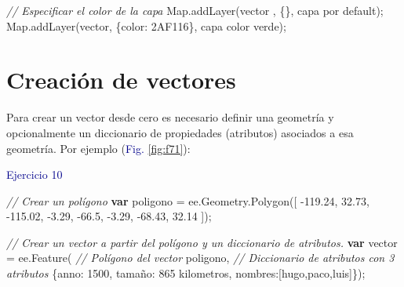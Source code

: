 \documentclass[
  12pt,
  letterpaper,
  twoside]{book}
\newenvironment{Shaded}{\begin{snugshade}}{\end{snugshade}}
\newcommand{\AttributeTok}[1]{\textcolor[rgb]{0.48,0.12,0.64}{#1}}
\newcommand{\BuiltInTok}[1]{#1}
\newcommand{\CommentTok}[1]{\textcolor[rgb]{0.24,0.58,0.00}{\textit{#1}}}
\newcommand{\DataTypeTok}[1]{\textcolor[rgb]{0.00,0.00,0.00}{#1}}
\newcommand{\DecValTok}[1]{\textcolor[rgb]{0.28,0.53,0.93}{#1}}
\newcommand{\FloatTok}[1]{\textcolor[rgb]{0.28,0.53,0.93}{#1}}
\newcommand{\FunctionTok}[1]{\textcolor[rgb]{0.48,0.12,0.64}{#1}}
\newcommand{\KeywordTok}[1]{\textcolor[rgb]{0.00,0.00,0.00}{\textbf{#1}}}
\newcommand{\NormalTok}[1]{#1}
\newcommand{\OperatorTok}[1]{\textcolor[rgb]{0.00,0.00,0.00}{#1}}
\newcommand{\StringTok}[1]{\textcolor[rgb]{0.87,0.29,0.22}{#1}}
\begin{document}
\begin{Shaded}
\begin{Highlighting}[]
\CommentTok{// Especificar el color de la capa }
\BuiltInTok{Map}\OperatorTok{.}\FunctionTok{addLayer}\NormalTok{(vector }\OperatorTok{,}\NormalTok{ \{\}}\OperatorTok{,} \StringTok{\textquotesingle{}capa por default\textquotesingle{}}\NormalTok{)}\OperatorTok{;}
\BuiltInTok{Map}\OperatorTok{.}\FunctionTok{addLayer}\NormalTok{(vector}\OperatorTok{,}\NormalTok{ \{}\DataTypeTok{color}\OperatorTok{:} \StringTok{\textquotesingle{}2AF116\textquotesingle{}}\NormalTok{\}}\OperatorTok{,} \StringTok{\textquotesingle{}capa color verde\textquotesingle{}}\NormalTok{)}\OperatorTok{;}
\end{Highlighting}
\end{Shaded}

\hypertarget{creaciuxf3n-de-vectores}{%
\section{Creación de vectores}\label{creaciuxf3n-de-vectores}}

Para crear un vector desde cero es necesario definir una geometría y opcionalmente un diccionario de propiedades (atributos) asociados a esa geometría. Por ejemplo (\textcolor{darkblue}{Fig.} \ref{fig:f71}):

\textcolor{darkblue}{Ejercicio 10}

\begin{Shaded}
\begin{Highlighting}[]
\CommentTok{// Crear un polígono}
\KeywordTok{var}\NormalTok{ poligono }\OperatorTok{=}\NormalTok{ ee}\OperatorTok{.}\AttributeTok{Geometry}\OperatorTok{.}\FunctionTok{Polygon}\NormalTok{([}
  \OperatorTok{{-}}\FloatTok{119.24}\OperatorTok{,} \FloatTok{32.73}\OperatorTok{,}
  \OperatorTok{{-}}\FloatTok{115.02}\OperatorTok{,} \OperatorTok{{-}}\FloatTok{3.29}\OperatorTok{,}
  \OperatorTok{{-}}\FloatTok{66.5}\OperatorTok{,} \OperatorTok{{-}}\FloatTok{3.29}\OperatorTok{,}
  \OperatorTok{{-}}\FloatTok{68.43}\OperatorTok{,} \FloatTok{32.14}
\NormalTok{])}\OperatorTok{;}

\CommentTok{// Crear un vector a partir del polígono y un diccionario de atributos.}
\KeywordTok{var}\NormalTok{ vector }\OperatorTok{=}\NormalTok{ ee}\OperatorTok{.}\FunctionTok{Feature}\NormalTok{(}
  \CommentTok{// Polígono del vector}
\NormalTok{  poligono}\OperatorTok{,}                      
  \CommentTok{// Diccionario de atributos con 3 atributos}
\NormalTok{  \{}\DataTypeTok{anno}\OperatorTok{:} \DecValTok{1500}\OperatorTok{,}                    
  \DataTypeTok{tamaño}\OperatorTok{:} \StringTok{\textquotesingle{}865 kilometros\textquotesingle{}}\OperatorTok{,}
  \DataTypeTok{nombres}\OperatorTok{:}\NormalTok{[}\StringTok{\textquotesingle{}hugo\textquotesingle{}}\OperatorTok{,}\StringTok{\textquotesingle{}paco\textquotesingle{}}\OperatorTok{,}\StringTok{\textquotesingle{}luis\textquotesingle{}}\NormalTok{]\})}\OperatorTok{;}
\end{Highlighting}
\end{Shaded}
\end{document}
